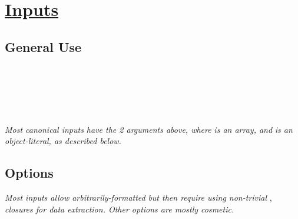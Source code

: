 \section{\href{https://observablehq.com/@observablehq/inputs}{Inputs}}

\subsection*{General Use}
\\
\\
\\
\\
\\

\textit{Most canonical inputs have the 2 arguments above, where }\textit{ is an array, and }\textit{ is an object-literal, as described below.}\\

\subsection*{Options}
\textit{Most inputs allow arbitrarily-formatted }\textit{ but then require using non-trivial }, \textit{ closures for data extraction. Other options are mostly cosmetic.}\\

